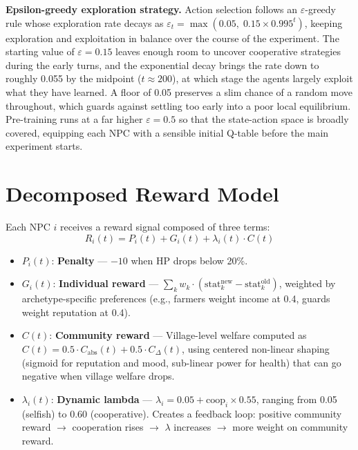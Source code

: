 \documentclass[12pt, a4paper, oneside]{report}
\begin{document}
\textbf{Epsilon-greedy exploration strategy.}
Action selection follows an $\varepsilon$-greedy rule whose exploration rate decays as $\varepsilon_t = \max(0.05,\; 0.15 \times 0.995^t)$, keeping exploration and exploitation in balance over the course of the experiment. The starting value of $\varepsilon = 0.15$ leaves enough room to uncover cooperative strategies during the early turns, and the exponential decay brings the rate down to roughly 0.055 by the midpoint ($t \approx 200$), at which stage the agents largely exploit what they have learned. A floor of 0.05 preserves a slim chance of a random move throughout, which guards against settling too early into a poor local equilibrium. Pre-training runs at a far higher $\varepsilon = 0.5$ so that the state-action space is broadly covered, equipping each NPC with a sensible initial Q-table before the main experiment starts.

\section{Decomposed Reward Model}
\label{sec:reward-model}

Each NPC $i$ receives a reward signal composed of three terms:
\begin{equation}
    R_i(t) = P_i(t) + G_i(t) + \lambda_i(t) \cdot C(t)
    \label{eq:reward}
\end{equation}

\begin{itemize}[nosep]
    \item $P_i(t)$: \textbf{Penalty} --- $-10$ when HP drops below 20\%.
    \item $G_i(t)$: \textbf{Individual reward} --- $\sum_k w_k \cdot (\text{stat}_k^{\text{new}} - \text{stat}_k^{\text{old}})$, weighted by archetype-specific preferences (e.g., farmers weight income at 0.4, guards weight reputation at 0.4).
    \item $C(t)$: \textbf{Community reward} --- Village-level welfare computed as $C(t) = 0.5 \cdot C_{\text{abs}}(t) + 0.5 \cdot C_{\Delta}(t)$, using centered non-linear shaping (sigmoid for reputation and mood, sub-linear power for health) that can go negative when village welfare drops.
    \item $\lambda_i(t)$: \textbf{Dynamic lambda} --- $\lambda_i = 0.05 + \text{coop}_i \times 0.55$, ranging from 0.05 (selfish) to 0.60 (cooperative). Creates a feedback loop: positive community reward $\to$ cooperation rises $\to$ $\lambda$ increases $\to$ more weight on community reward.
\end{itemize}
\end{document}
